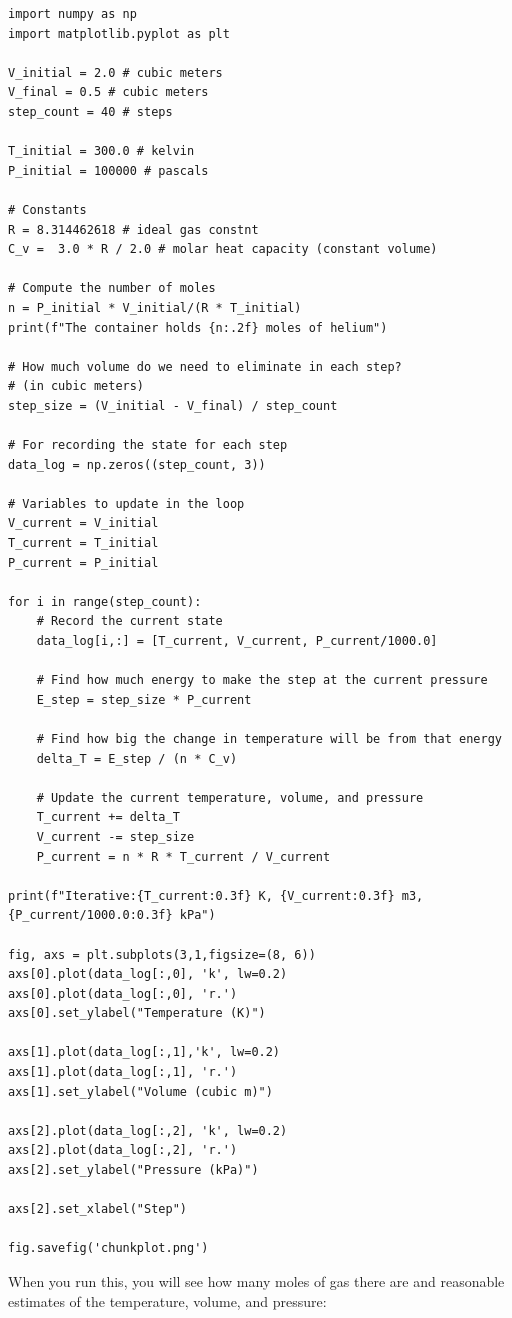 \begin{Verbatim}
import numpy as np
import matplotlib.pyplot as plt

V_initial = 2.0 # cubic meters
V_final = 0.5 # cubic meters
step_count = 40 # steps

T_initial = 300.0 # kelvin
P_initial = 100000 # pascals

# Constants
R = 8.314462618 # ideal gas constnt
C_v =  3.0 * R / 2.0 # molar heat capacity (constant volume)

# Compute the number of moles
n = P_initial * V_initial/(R * T_initial) 
print(f"The container holds {n:.2f} moles of helium")

# How much volume do we need to eliminate in each step? 
# (in cubic meters)
step_size = (V_initial - V_final) / step_count

# For recording the state for each step
data_log = np.zeros((step_count, 3))

# Variables to update in the loop
V_current = V_initial
T_current = T_initial
P_current = P_initial

for i in range(step_count):
    # Record the current state
    data_log[i,:] = [T_current, V_current, P_current/1000.0]

    # Find how much energy to make the step at the current pressure
    E_step = step_size * P_current

    # Find how big the change in temperature will be from that energy
    delta_T = E_step / (n * C_v)

    # Update the current temperature, volume, and pressure
    T_current += delta_T
    V_current -= step_size
    P_current = n * R * T_current / V_current

print(f"Iterative:{T_current:0.3f} K, {V_current:0.3f} m3, {P_current/1000.0:0.3f} kPa")

fig, axs = plt.subplots(3,1,figsize=(8, 6))
axs[0].plot(data_log[:,0], 'k', lw=0.2)
axs[0].plot(data_log[:,0], 'r.')
axs[0].set_ylabel("Temperature (K)")

axs[1].plot(data_log[:,1],'k', lw=0.2)
axs[1].plot(data_log[:,1], 'r.')
axs[1].set_ylabel("Volume (cubic m)")

axs[2].plot(data_log[:,2], 'k', lw=0.2)
axs[2].plot(data_log[:,2], 'r.')
axs[2].set_ylabel("Pressure (kPa)")

axs[2].set_xlabel("Step")

fig.savefig('chunkplot.png')
\end{Verbatim}

When you run this,  you will see how many moles of gas there are and reasonable estimates of the temperature,  volume,  and pressure:

